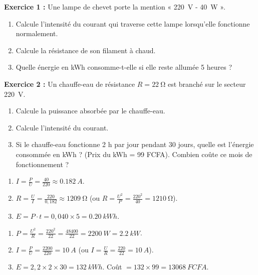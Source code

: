 \documentclass[11pt]{article}
\begin{document}
\begin{exercice}
\textbf{Exercice 1 :} Une lampe de chevet porte la mention « \SI{220}{V} - \SI{40}{W} ».
\begin{enumerate}
\item Calcule l'intensité du courant qui traverse cette lampe lorsqu'elle fonctionne normalement.
\item Calcule la résistance de son filament à chaud.
\item Quelle énergie en kWh consomme-t-elle si elle reste allumée 5 heures ?
\end{enumerate}

\textbf{Exercice 2 :} Un chauffe-eau de résistance $R = \SI{22}{\ohm}$ est branché sur le secteur \SI{220}{V}.
\begin{enumerate}
\item Calcule la puissance absorbée par le chauffe-eau.
\item Calcule l'intensité du courant.
\item Si le chauffe-eau fonctionne 2 h par jour pendant 30 jours, quelle est l'énergie consommée en kWh ? (Prix du kWh = 99 FCFA). Combien coûte ce mois de fonctionnement ?
\end{enumerate}
\end{exercice}

\begin{corrige}[Exercice 1]
\begin{enumerate}
\item $I = \frac{P}{U} = \frac{40}{220} \approx \SI{0,182}{A}$.
\item $R = \frac{U}{I} = \frac{220}{0,182} \approx \SI{1209}{\ohm}$ (ou $R = \frac{U^2}{P} = \frac{220^2}{40} = \SI{1210}{\ohm}$).
\item $E = P \cdot t = 0,040 \times 5 = \SI{0,20}{kWh}$.
\end{enumerate}
\end{corrige}

\begin{corrige}[Exercice 2]
\begin{enumerate}
\item $P = \frac{U^2}{R} = \frac{220^2}{22} = \frac{48400}{22} = \SI{2200}{W} = \SI{2,2}{kW}$.
\item $I = \frac{P}{U} = \frac{2200}{220} = \SI{10}{A}$ (ou $I = \frac{U}{R} = \frac{220}{22} = \SI{10}{A}$).
\item $E = 2,2 \times 2 \times 30 = \SI{132}{kWh}$. Coût $= 132 \times 99 = \SI{13068}{FCFA}$.
\end{enumerate}
\end{corrige}
\end{document}
